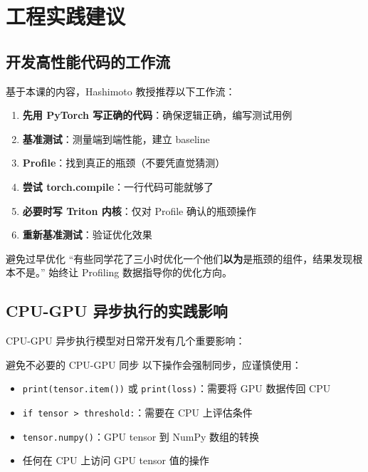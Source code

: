 \section{工程实践建议}

\subsection{开发高性能代码的工作流}

基于本课的内容，Hashimoto 教授推荐以下工作流：

\begin{enumerate}
    \item \textbf{先用 PyTorch 写正确的代码}：确保逻辑正确，编写测试用例
    \item \textbf{基准测试}：测量端到端性能，建立 baseline
    \item \textbf{Profile}：找到真正的瓶颈（不要凭直觉猜测）
    \item \textbf{尝试 torch.compile}：一行代码可能就够了
    \item \textbf{必要时写 Triton 内核}：仅对 Profile 确认的瓶颈操作
    \item \textbf{重新基准测试}：验证优化效果
\end{enumerate}

\begin{warningbox}{避免过早优化}
``有些同学花了三小时优化一个他们\textbf{以为}是瓶颈的组件，结果发现根本不是。'' 始终让 Profiling 数据指导你的优化方向。
\end{warningbox}

\subsection{CPU-GPU 异步执行的实践影响}

CPU-GPU 异步执行模型对日常开发有几个重要影响：

\begin{importantbox}{避免不必要的 CPU-GPU 同步}
以下操作会强制同步，应谨慎使用：
\begin{itemize}
    \item \texttt{print(tensor.item())} 或 \texttt{print(loss)}：需要将 GPU 数据传回 CPU
    \item \texttt{if tensor > threshold:}：需要在 CPU 上评估条件
    \item \texttt{tensor.numpy()}：GPU tensor 到 NumPy 数组的转换
    \item 任何在 CPU 上访问 GPU tensor 值的操作
\end{itemize}
\end{importantbox}

